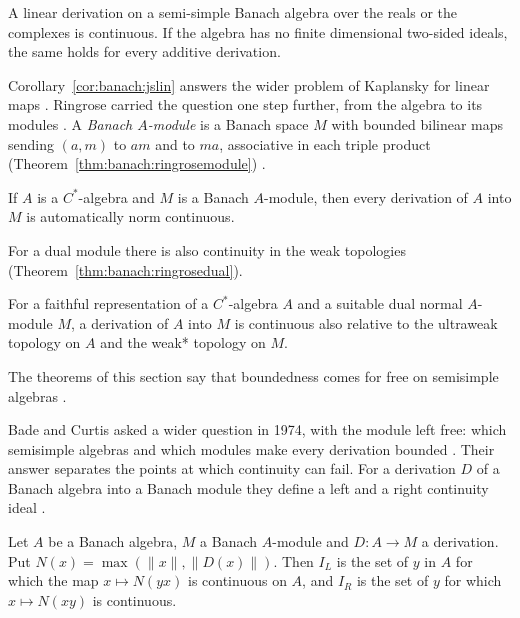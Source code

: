 \begin{corollary}\label{cor:banach:jslin}
A linear derivation on a semi-simple Banach algebra over the reals or the
complexes is continuous. If the algebra has no finite dimensional
two-sided ideals, the same holds for every additive derivation.
\end{corollary}

Corollary~\ref{cor:banach:jslin} answers the wider problem of Kaplansky for
linear maps \cite[p.~1067]{JohnsonSinclair1968}. Ringrose carried the
question one step further, from the algebra to its modules
\cite[p.~432]{Ringrose1972Automatic}. A \emph{Banach $A$-module} is a
Banach space $M$ with bounded bilinear maps sending $(a,m)$ to $am$ and
to $ma$, associative in each triple product (Theorem~\ref{thm:banach:ringrosemodule})
\cite[p.~432]{Ringrose1972Automatic}.\begin{theorem}\label{thm:banach:ringrosemodule}
If $A$ is a $C^*$-algebra and $M$ is a Banach $A$-module, then every
derivation of $A$ into $M$ is automatically norm continuous.
\end{theorem}

For a dual module there is also continuity in the weak topologies (Theorem~\ref{thm:banach:ringrosedual}).

\begin{theorem}\label{thm:banach:ringrosedual}
For a faithful representation of a $C^*$-algebra $A$ and a suitable dual
normal $A$-module $M$, a derivation of $A$ into $M$ is continuous also
relative to the ultraweak topology on $A$ and the weak* topology on $M$.
\end{theorem}

The theorems of this section say that boundedness comes for free on
semisimple algebras \cite[Remark~4.3, p.~1072]{JohnsonSinclair1968}.

Bade and Curtis asked a wider question in 1974, with the module left free:
which semisimple algebras and which modules make every derivation
bounded \cite[p.~373]{BadeCurtis1974}. Their answer separates the points at
which continuity can fail. For a derivation $D$ of a Banach algebra into a
Banach module they define a left and a right continuity ideal
\cite[Definition~2.1, p.~374]{BadeCurtis1974}.

\begin{definition}\label{def:banach:continuity-ideal}
Let $A$ be a Banach algebra, $M$ a Banach $A$-module and $D\colon A\to M$ a
derivation. Put $N(x)=\max(\|x\|,\|D(x)\|)$. Then $I_L$ is the set of $y$ in
$A$ for which the map $x\mapsto N(yx)$ is continuous on $A$, and $I_R$ is the
set of $y$ for which $x\mapsto N(xy)$ is continuous.
\end{definition}

